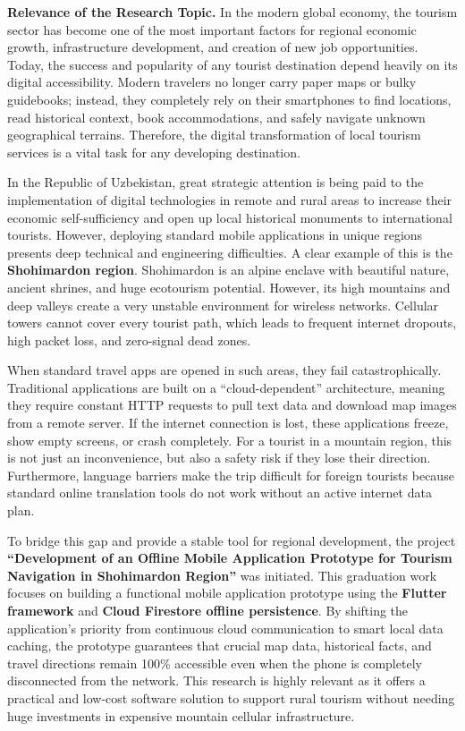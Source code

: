 \documentclass[12pt,a4paper,oneside]{report}
\begin{document}
\noindent\textbf{Relevance of the Research Topic.} In the modern global economy, the
tourism sector has become one of the most important factors for regional economic
growth, infrastructure development, and creation of new job opportunities. Today, the
success and popularity of any tourist destination depend heavily on its digital
accessibility. Modern travelers no longer carry paper maps or bulky guidebooks;
instead, they completely rely on their smartphones to find locations, read historical
context, book accommodations, and safely navigate unknown geographical terrains.
Therefore, the digital transformation of local tourism services is a vital task for any
developing destination.

In the Republic of Uzbekistan, great strategic attention is being paid to the
implementation of digital technologies in remote and rural areas to increase their
economic self-sufficiency and open up local historical monuments to international
tourists. However, deploying standard mobile applications in unique regions presents
deep technical and engineering difficulties. A clear example of this is the
\textbf{Shohimardon region}. Shohimardon is an alpine enclave with beautiful nature,
ancient shrines, and huge ecotourism potential. However, its high mountains and deep
valleys create a very unstable environment for wireless networks. Cellular towers
cannot cover every tourist path, which leads to frequent internet dropouts, high packet
loss, and zero-signal dead zones.

When standard travel apps are opened in such areas, they fail catastrophically.
Traditional applications are built on a ``cloud-dependent'' architecture, meaning they
require constant HTTP requests to pull text data and download map images from a remote
server. If the internet connection is lost, these applications freeze, show empty
screens, or crash completely. For a tourist in a mountain region, this is not just an
inconvenience, but also a safety risk if they lose their direction. Furthermore,
language barriers make the trip difficult for foreign tourists because standard online
translation tools do not work without an active internet data plan.

To bridge this gap and provide a stable tool for regional development, the project
\textbf{``Development of an Offline Mobile Application Prototype for Tourism Navigation
in Shohimardon Region''} was initiated. This graduation work focuses on building a
functional mobile application prototype using the \textbf{Flutter framework} and
\textbf{Cloud Firestore offline persistence}. By shifting the application's priority
from continuous cloud communication to smart local data caching, the prototype
guarantees that crucial map data, historical facts, and travel directions remain 100\%
accessible even when the phone is completely disconnected from the network. This
research is highly relevant as it offers a practical and low-cost software solution to
support rural tourism without needing huge investments in expensive mountain cellular
infrastructure.
\end{document}
